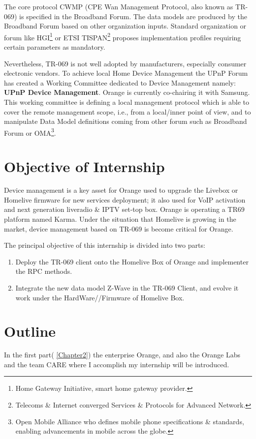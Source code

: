 The core protocol CWMP (CPE Wan Management Protocol, also known as TR-069) is specified in the Broadband Forum. The data models are produced by the Broadband Forum based on other organization inputs. Standard organization or forum like HGI\footnote{Home Gateway Initiative, smart home gateway provider.} or ETSI TISPAN\footnote{Telecoms \& Internet converged Services \& Protocols for Advanced Network.} proposes implementation profiles requiring certain parameters as mandatory.

Nevertheless, TR-069 is not well adopted by manufacturers, especially consumer electronic vendors. To achieve local Home Device Management the UPnP Forum has created a Working Committee dedicated to Device Management namely: \textbf{UPnP Device Management}. Orange is currently co-chairing it with Samsung. This working committee is defining a local management protocol which is able to cover the remote management scope, i.e., from a local/inner point of view, and to manipulate Data Model definitions coming from other forum such as Broadband Forum or OMA\footnote{Open Mobile Alliance who defines mobile phone specifications \& standards, enabling advancements in mobile across the globe.}.
\section{Objective of Internship}

Device management is a key asset for Orange used to upgrade the Livebox or Homelive firmware for new services deployment; it also used for VoIP activation and next generation liveradio \& IPTV set-top box. Orange is operating a TR69 platform named Karma. Under the situation that Homelive is growing in the market, device management based on TR-069 is become critical for Orange.

The principal objective of this internship is divided into two parts:
\begin{enumerate}
\it
\item Deploy the TR-069 client onto the Homelive Box of Orange and implementer the RPC methods.
\item Integrate the new data model Z-Wave in the TR-069 Client, and evolve it work under the HardWare//Firmware of Homelive Box.
\end{enumerate}

\section{Outline}
In the first part( \autoref{Chapter2}) the enterprise Orange, and also the Orange Labs and the team CARE where I accomplish my internship will be introduced.

